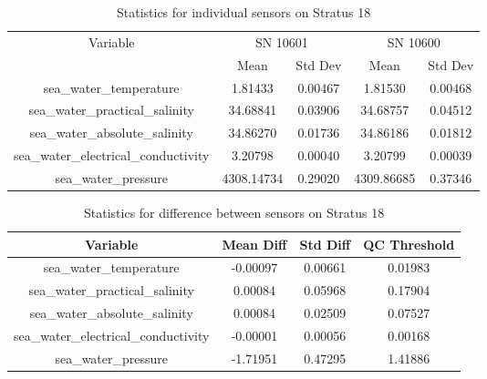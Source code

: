 \begin{table}[h]
\centering
\begin{tabular}{|c|c|c|c|c|}
\hline
Variable & \multicolumn{2}{c|}{SN 10601} & \multicolumn{2}{c|}{SN 10600} \\
& Mean & Std Dev & Mean & Std Dev \\
\hline
sea\_water\_temperature & 1.81433 & 0.00467 & 1.81530 & 0.00468 \\
sea\_water\_practical\_salinity & 34.68841 & 0.03906 & 34.68757 & 0.04512 \\
sea\_water\_absolute\_salinity & 34.86270 & 0.01736 & 34.86186 & 0.01812 \\
sea\_water\_electrical\_conductivity & 3.20798 & 0.00040 & 3.20799 & 0.00039 \\
sea\_water\_pressure & 4308.14734 & 0.29020 & 4309.86685 & 0.37346 \\
\hline
\end{tabular}
\caption{Statistics for individual sensors on Stratus 18}
\end{table}

\begin{table}[h]
\centering
\begin{tabular}{|c|c|c|c|}
\hline
Variable & Mean Diff & Std Diff & QC Threshold \\
\hline
sea\_water\_temperature & -0.00097 & 0.00661 & 0.01983 \\
sea\_water\_practical\_salinity & 0.00084 & 0.05968 & 0.17904 \\
sea\_water\_absolute\_salinity & 0.00084 & 0.02509 & 0.07527 \\
sea\_water\_electrical\_conductivity & -0.00001 & 0.00056 & 0.00168 \\
sea\_water\_pressure & -1.71951 & 0.47295 & 1.41886 \\
\hline
\end{tabular}
\caption{Statistics for difference between sensors on Stratus 18}
\end{table}

